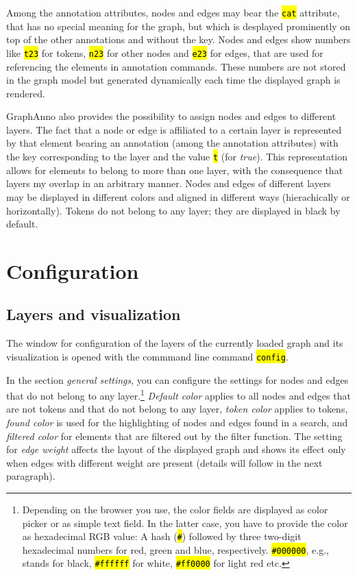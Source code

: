 \documentclass[12pt]{scrartcl}
\newcommand{\code}[1]{\hl{\texttt{#1}}}
\begin{document}
Among the annotation attributes, nodes and edges may bear the \code{cat} attribute, that has no special meaning for the graph, but which is desplayed prominently on top of the other annotations and without the key.
Nodes and edges show numbers like \code{t23} for tokens, \code{n23} for other nodes and \code{e23} for edges, that are used for referencing the elements in annotation commands.
These numbers are not stored in the graph model but generated dynamically each time the displayed graph is rendered.

GraphAnno also provides the possibility to assign nodes and edges to different layers.
The fact that a node or edge is affiliated to a certain layer is represented by that element bearing an annotation (among the annotation attributes) with the key corresponding to the layer and the value \code{t} (for \textit{true}).
This representation allows for elements to belong to more than one layer, with the consequence that layers my overlap in an arbitrary manner.
Nodes and edges of different layers may be displayed in different colors and aligned in different ways (hierachically or horizontally).
Tokens do not belong to any layer; they are displayed in black by default.



\section{Configuration}\label{konfiguration}

\subsection{Layers and visualization}\label{ebenenkonfiguration}

The window for configuration of the layers of the currently loaded graph and its visualization is opened with the commmand line command \code{config}.

In the section \textit{general settings}, you can configure the settings for nodes and edges that do not belong to any layer.\footnote{Depending on the browser you use, the color fields are displayed as color picker or as simple text field. In the latter case, you have to provide the color as hexadecimal RGB value: A hash (\code{\#}) followed by three two-digit hexadecimal numbers for red, green and blue, respectively. \code{\#000000}, e.g., stands for black, \code{\#ffffff} for white, \code{\#ff0000} for light red etc.}
\textit{Default color} applies to all nodes and edges that are not tokens and that do not belong to any layer, \textit{token color} applies to tokens, \textit{found color} is used for the highlighting of nodes and edges found in a search, and \textit{filtered color} for elements that are filtered out by the filter function.
The setting for \textit{edge weight} affects the layout of the displayed graph and shows its effect only when edges with different weight are present (details will follow in the next paragraph).
\end{document}
